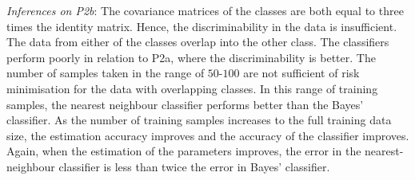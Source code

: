\documentclass[11pt, a4 paper]{article}
\begin{document}
{\it Inferences on P2b}: The covariance matrices of the classes are both equal to three times the identity matrix. Hence, the discriminability in the data is insufficient. The data from either of the classes overlap into the other class. The classifiers perform poorly in relation to P2a, where the discriminability is better. The number of samples taken in the range of $50$-$100$ are not sufficient of risk minimisation for the data with overlapping classes. In this range of training samples, the nearest neighbour classifier performs better than the Bayes' classifier. As the number of training samples increases to the full training data size, the estimation accuracy improves and the accuracy of the classifier improves. Again, when the estimation of the parameters improves, the error in the nearest-neighbour classifier is less than twice the error in Bayes' classifier.
\end{document}
